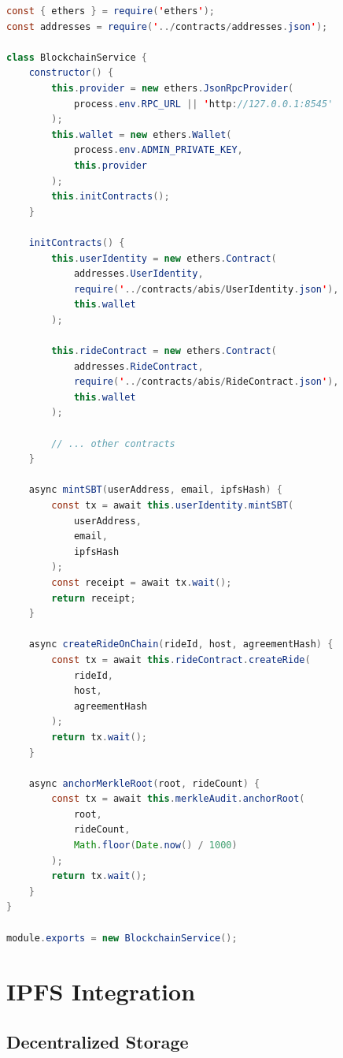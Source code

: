\begin{lstlisting}[language=Java, caption=blockchain.js Utility]
const { ethers } = require('ethers');
const addresses = require('../contracts/addresses.json');

class BlockchainService {
    constructor() {
        this.provider = new ethers.JsonRpcProvider(
            process.env.RPC_URL || 'http://127.0.0.1:8545'
        );
        this.wallet = new ethers.Wallet(
            process.env.ADMIN_PRIVATE_KEY,
            this.provider
        );
        this.initContracts();
    }
    
    initContracts() {
        this.userIdentity = new ethers.Contract(
            addresses.UserIdentity,
            require('../contracts/abis/UserIdentity.json'),
            this.wallet
        );
        
        this.rideContract = new ethers.Contract(
            addresses.RideContract,
            require('../contracts/abis/RideContract.json'),
            this.wallet
        );
        
        // ... other contracts
    }
    
    async mintSBT(userAddress, email, ipfsHash) {
        const tx = await this.userIdentity.mintSBT(
            userAddress,
            email,
            ipfsHash
        );
        const receipt = await tx.wait();
        return receipt;
    }
    
    async createRideOnChain(rideId, host, agreementHash) {
        const tx = await this.rideContract.createRide(
            rideId,
            host,
            agreementHash
        );
        return tx.wait();
    }
    
    async anchorMerkleRoot(root, rideCount) {
        const tx = await this.merkleAudit.anchorRoot(
            root,
            rideCount,
            Math.floor(Date.now() / 1000)
        );
        return tx.wait();
    }
}

module.exports = new BlockchainService();
\end{lstlisting}

\section{IPFS Integration}

\subsection{Decentralized Storage}

